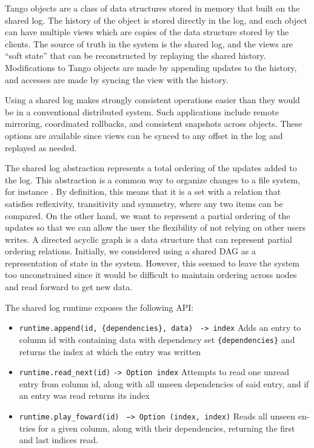 \documentclass[letterpaper,twocolumn,10pt]{article}
\begin{document}
Tango objects are a class of data structures stored in memory that built on the shared log. The history of the object is stored directly in the log, and each object can have multiple views which are copies of the data structure stored by the clients. The source of truth in the system is the shared log, and the views are ``soft state'' that can be reconstructed by replaying the shared history. Modifications to Tango objects are made by appending updates to the history, and accesses are made by syncing the view with the history.

Using a shared log makes strongly consistent operations easier than they would be in a conventional distributed system. Such applications include remote mirroring, coordinated rollbacks, and consistent snapshots across objects. These options are available since views can be synced to any offset in the log and replayed as needed.

The shared log abstraction represents a total ordering of the updates added to the log. This abstraction is a common way to organize changes to a file system, for instance \cite{Log}. By definition, this means that it is a set with a relation that satisfies reflexivity, transitivity and symmetry, where any two items can be compared. On the other hand, we want to represent a partial ordering of the updates so that we can allow the user the flexibility of not relying on other users writes. A directed acyclic graph is a data structure that can represent partial ordering relations. Initially, we considered using a shared DAG as a representation of state in the system. However, this seemed to leave the system too unconstrained since it would be difficult to maintain ordering across nodes and read forward to get new data. 

The shared log runtime exposes the following API:

\begin{itemize}

\item \verb_runtime.append(id, {dependencies}, data)_ \verb_ -> index_ Adds an entry to column id with containing data with dependency set \verb_{dependencies}_ and returns the index at which the entry was written

\item \verb~runtime.read_next(id)~ \verb~-> Option index~ Attempts to read one unread entry from column id, along with all unseen dependencies of said entry, and if an entry was read returns its index

\item \verb~runtime.play_foward(id)~ \verb~ −> Option (index, index)~ Reads all unseen en- tries for a given column, along with their dependencies, returning the first and last indices read.

\end{itemize}
\end{document}
